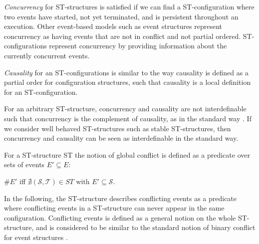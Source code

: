     \emph{Concurrency} for ST-structures is satisfied if we can find a ST-configuration where two events have started, not yet terminated, and is persistent throughout an execution. Other event-based models such as event structures represent concurrency as having events that are not in conflict and not partial ordered. ST-configurations represent concurrency by providing information about the currently concurrent events. 
    
    \emph{Causality} for an ST-configurations is similar to the way causality is defined as a partial order for configuration structures, such that  causality is a local definition for an ST-configuration.
    
    For an arbitrary ST-structure, concurrency and causality are not interdefinable such that concurrency is the complement of causality, as in the standard way \cite[Definition 5.6]{GlabbeekG01refinement}. If we consider well behaved ST-structures such as stable ST-structures, then concurrency and causality can be seen as interdefinable in the standard way.
    
    \begin{definition}
        \label{def:ST-structure conflict}
        For a ST-structure ST the notion of global conflict is defined as a predicate over sets of events $E' \subseteq E$:
        
        \begin{center}
            $\# E'$ iff $\nexists (\mathcal{S},\mathcal{T}) \in ST$ with $E' \subseteq \mathcal{S}$.
        \end{center}
    \end{definition}
    
    In the following, the ST-structure describes conflicting events as a predicate where conflicting events in a ST-structure can never appear in the same configuration. Conflicting events is defined as a general notion on the whole ST-structure, and is considered to be similar to the standard notion of binary conflict for event structures \cite{winskel95modelsCategory}.

